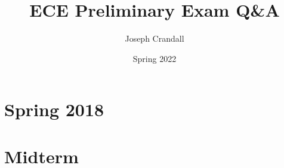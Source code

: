 
\usepackage{algorithm, algpseudocode, color, gensymb, siunitx, soul, subfiles}

\title{ECE Preliminary Exam Q\&A}
\author{Joseph Crandall}
\date{Spring 2022}


\maketitle

%

\section{Spring 2018}


\section{Midterm}


%

%

%

%

%


